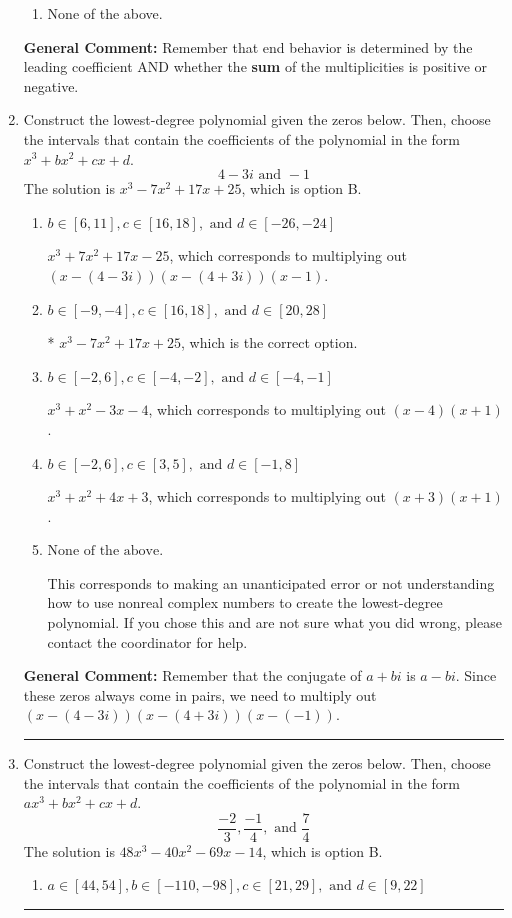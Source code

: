 \documentclass{extbook}[14pt]
\newcommand{\litem}[1]{\item #1

\rule{\textwidth}{0.4pt}}
\begin{document}
\begin{enumerate}
{\begin{enumerate}[label=\Alph*.]
\begin{multicols}{2}
\end{multicols}\item None of the above.\end{enumerate}
\textbf{General Comment:} Remember that end behavior is determined by the leading coefficient AND whether the \textbf{sum} of the multiplicities is positive or negative.
}
\litem{
Construct the lowest-degree polynomial given the zeros below. Then, choose the intervals that contain the coefficients of the polynomial in the form $x^3+bx^2+cx+d$.
\[ 4 - 3 i \text{ and } -1 \]The solution is \( x^{3} -7 x^{2} +17 x + 25 \), which is option B.\begin{enumerate}[label=\Alph*.]
\item \( b \in [6, 11], c \in [16, 18], \text{ and } d \in [-26, -24] \)

$x^{3} +7 x^{2} +17 x -25$, which corresponds to multiplying out $(x-(4 - 3 i))(x-(4 + 3 i))(x -1)$.
\item \( b \in [-9, -4], c \in [16, 18], \text{ and } d \in [20, 28] \)

* $x^{3} -7 x^{2} +17 x + 25$, which is the correct option.
\item \( b \in [-2, 6], c \in [-4, -2], \text{ and } d \in [-4, -1] \)

$x^{3} + x^{2} -3 x -4$, which corresponds to multiplying out $(x -4)(x + 1)$.
\item \( b \in [-2, 6], c \in [3, 5], \text{ and } d \in [-1, 8] \)

$x^{3} + x^{2} +4 x + 3$, which corresponds to multiplying out $(x + 3)(x + 1)$.
\item \( \text{None of the above.} \)

This corresponds to making an unanticipated error or not understanding how to use nonreal complex numbers to create the lowest-degree polynomial. If you chose this and are not sure what you did wrong, please contact the coordinator for help.
\end{enumerate}

\textbf{General Comment:} Remember that the conjugate of $a+bi$ is $a-bi$. Since these zeros always come in pairs, we need to multiply out $(x-(4 - 3 i))(x-(4 + 3 i))(x-(-1))$.
}
\litem{
Construct the lowest-degree polynomial given the zeros below. Then, choose the intervals that contain the coefficients of the polynomial in the form $ax^3+bx^2+cx+d$.
\[ \frac{-2}{3}, \frac{-1}{4}, \text{ and } \frac{7}{4} \]The solution is \( 48x^{3} -40 x^{2} -69 x -14 \), which is option B.\begin{enumerate}[label=\Alph*.]
\item \( a \in [44, 54], b \in [-110, -98], c \in [21, 29], \text{ and } d \in [9, 22] \)


\end{enumerate}}
\end{enumerate}
\end{document}

